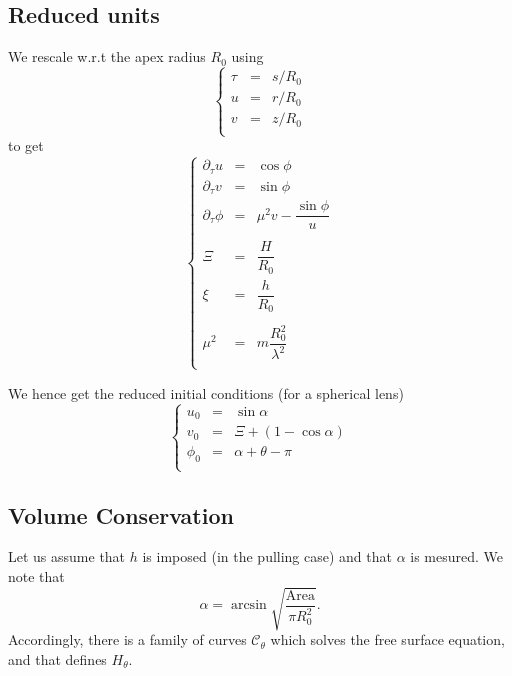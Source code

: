 \documentclass[aps,onecolumn]{revtex4}
\begin{document}
\subsection{Reduced units}
We rescale w.r.t the apex radius $R_0$ using
\begin{equation}
	\left\lbrace
	\begin{array}{rcl}
		\tau & = & s/R_0 \\
		 u   & = & r/R_0 \\
		 v   & = & z/R_0 \\
	\end{array}
	\right.
\end{equation}
to get
\begin{equation}
	\left\lbrace
	\begin{array}{rcl}
	\partial_\tau u & = & \cos\phi\\
	\partial_\tau v & = & \sin\phi\\
	\partial_\tau \phi & = &  \mu^2 v - \dfrac{\sin\phi}{u}\\
	\\
	\Xi            & = & \dfrac{H}{R_0}\\
	\xi            & = & \dfrac{h}{R_0}\\
	\\
	\mu^2                & = & m\dfrac{R_0^2}{\lambda^2}\\
	\end{array}
	\right.
\end{equation}

We hence get the reduced initial conditions (for a spherical lens)
\begin{equation}
\left\lbrace
\begin{array}{rcl}
	u_0    & = & \sin\alpha\\
	v_0    & = & \Xi + (1-\cos\alpha)\\
	\phi_0 & = & \alpha+\theta-\pi\\
\end{array}
\right.
\end{equation}

\subsection{Volume Conservation}
Let us assume that $h$ is imposed (in the pulling case) and that $\alpha$ is mesured.
We note that
\begin{equation}
	\alpha = \arcsin\sqrt{\dfrac{\mathrm{Area}}{\pi R_0^2}}.
\end{equation}
Accordingly, there is a family of curves $\mathcal{C}_\theta$ which solves the free surface equation,
and that defines $H_\theta$.
\end{document}
